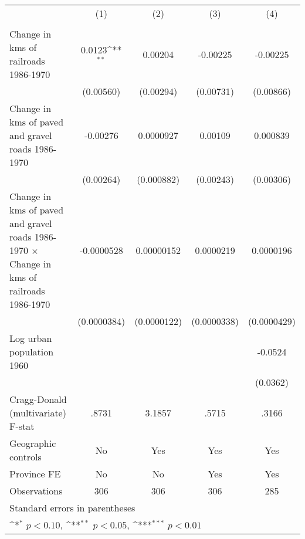 {
\def\sym#1{\ifmmode^{#1}\else\(^{#1}\)\fi}
\begin{tabular}{l*{4}{c}}
\hline\hline
                &\multicolumn{1}{c}{(1)}&\multicolumn{1}{c}{(2)}&\multicolumn{1}{c}{(3)}&\multicolumn{1}{c}{(4)}\\
                &\multicolumn{1}{c}{}&\multicolumn{1}{c}{}&\multicolumn{1}{c}{}&\multicolumn{1}{c}{}\\
\hline
Change in kms of railroads 1986-1970&   0.0123\sym{**} &  0.00204         & -0.00225         & -0.00225         \\
                &(0.00560)         &(0.00294)         &(0.00731)         &(0.00866)         \\
[1em]
Change in kms of paved and gravel roads 1986-1970& -0.00276         &0.0000927         &  0.00109         & 0.000839         \\
                &(0.00264)         &(0.000882)         &(0.00243)         &(0.00306)         \\
[1em]
Change in kms of paved and gravel roads 1986-1970 $\times$ Change in kms of railroads 1986-1970&-0.0000528         &0.00000152         &0.0000219         &0.0000196         \\
                &(0.0000384)         &(0.0000122)         &(0.0000338)         &(0.0000429)         \\
[1em]
Log urban population 1960&                  &                  &                  &  -0.0524         \\
                &                  &                  &                  & (0.0362)         \\
\hline
Cragg-Donald (multivariate) F-stat&    .8731         &   3.1857         &    .5715         &    .3166         \\
Geographic controls&       No         &      Yes         &      Yes         &      Yes         \\
Province FE     &       No         &       No         &      Yes         &      Yes         \\
Observations    &      306         &      306         &      306         &      285         \\
\hline\hline
\multicolumn{5}{l}{\footnotesize Standard errors in parentheses}\\
\multicolumn{5}{l}{\footnotesize \sym{*} \(p<0.10\), \sym{**} \(p<0.05\), \sym{***} \(p<0.01\)}\\
\end{tabular}
}
